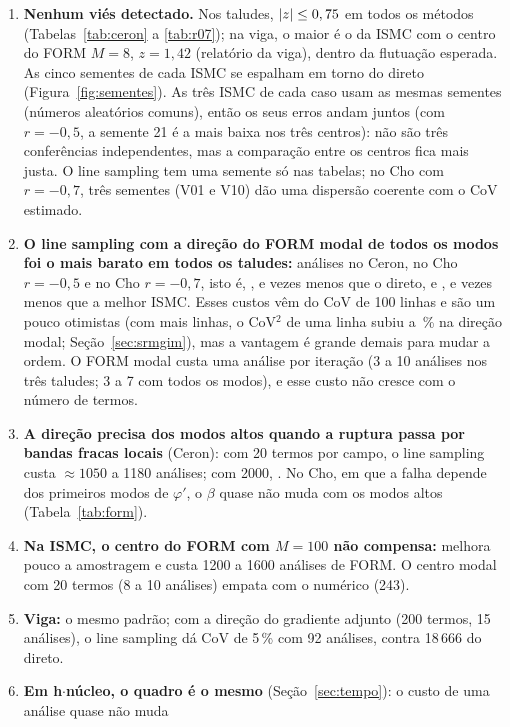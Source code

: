 \documentclass[11pt,a4paper]{article}
\begin{document}
\begin{enumerate}
  \item \textbf{Nenhum viés detectado.} Nos taludes, $|z| \le 0,75$ em todos os métodos (Tabelas~\ref{tab:ceron} a
    \ref{tab:r07}); na viga, o maior é o da ISMC com o centro do FORM $M = 8$, $z = 1{,}42$ (relatório da viga), dentro da
    flutuação esperada. As cinco sementes de cada ISMC se espalham em torno do direto (Figura~\ref{fig:sementes}). As
    três ISMC de cada caso usam as mesmas sementes (números aleatórios comuns), então os seus erros andam juntos (com
    $r = -0{,}5$, a semente 21 é a mais baixa nos três centros): não são três conferências independentes, mas a comparação entre os
    centros fica mais justa. O line sampling tem uma semente só nas tabelas; no Cho com $r = -0{,}7$, três sementes (V01 e V10) dão
    uma dispersão coerente com o CoV estimado.
  \item \textbf{O line sampling com a direção do FORM modal de todos os modos foi o mais barato em todos os taludes:}
    \lsNCe{} análises no Ceron, \lsNRa{} no Cho $r = -0{,}5$ e \lsNRb{} no Cho $r = -0{,}7$, isto é, \lsGanhoCe, \lsGanhoRa{}
    e \lsGanhoRb{} vezes menos que o direto, e \lsGanhoIsmcCe, \lsGanhoIsmcRa{} e \lsGanhoIsmcRb{} vezes menos que a melhor
    ISMC. Esses custos vêm do CoV de 100 linhas e são um pouco otimistas (com mais linhas, o CoV$^2$ de uma linha subiu
    \sglCovDoisGmMin{} a \sglCovDoisGmMax\,\% na direção modal; Seção~\ref{sec:srmgim}), mas a vantagem é grande demais para
    mudar a ordem. O FORM modal custa uma análise por iteração (3 a 10 análises nos três taludes; 3 a 7 com todos os modos), e esse
    custo não cresce com o número de termos.
  \item \textbf{A direção precisa dos modos altos quando a ruptura passa por bandas fracas locais} (Ceron): com 20 termos
    por campo, o line sampling custa $\approx 1050$ a 1180 análises; com 2000, \lsNCe. No Cho, em que a falha depende
    dos primeiros modos de $\varphi'$, o $\beta$ quase não muda com os modos altos (Tabela~\ref{tab:form}).
  \item \textbf{Na ISMC, o centro do FORM com $M = 100$ não compensa:} melhora pouco a amostragem e custa 1200 a 1600
    análises de FORM. O centro modal com 20 termos (8 a 10 análises) empata com o numérico (243).
  \item \textbf{Viga:} o mesmo padrão; com a direção do gradiente adjunto (200 termos, 15 análises), o line sampling dá
    CoV de 5\,\% com 92 análises, contra 18\,666 do direto.
  \item \textbf{Em h$\cdot$núcleo, o quadro é o mesmo} (Seção~\ref{sec:tempo}): o custo de uma análise quase não muda

\end{enumerate}
\end{document}
